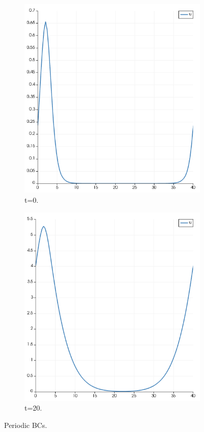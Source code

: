 \documentclass[11pt,letterpaper]{article}
\begin{document}
	\begin{figure}[htbp!]
		\centering
		\begin{subfigure}[t]{0.4\textwidth}
			\centering
			\includegraphics[width=\linewidth]{periodic_bc2_1}
			\caption{t=0.}
		\end{subfigure}
		\begin{subfigure}[t]{0.4\textwidth}
			\centering
			\includegraphics[width=\linewidth]{periodic_bc2_2}
			\caption{t=20.}
		\end{subfigure}
		\hfill
		\caption{Periodic BCs.}
		\label{fig:periodic}
	\end{figure}
\end{document}
